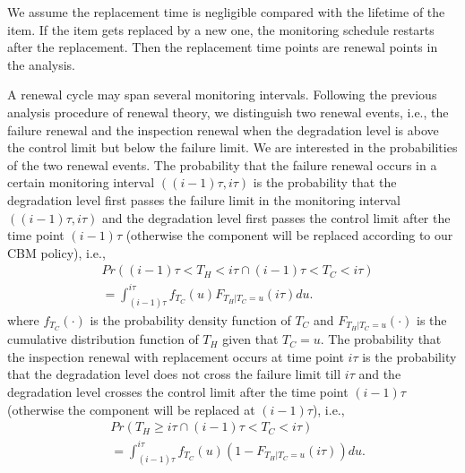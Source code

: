 \documentclass[10pt,a4paper]{article}
\theoremstyle{remark}
\begin{document}
We assume the replacement time is negligible compared with the lifetime of the item. If the item gets replaced by a new one, the monitoring schedule restarts after the replacement. Then the replacement time points are renewal points in the analysis. 

A renewal cycle may span several monitoring intervals. Following the previous analysis procedure of renewal theory, we distinguish two renewal events, i.e., the failure renewal and the inspection renewal when the degradation level is above the control limit but below the failure limit. We are interested in the probabilities of the two renewal events. The probability that the failure renewal occurs in a certain monitoring interval $((i-1)\tau,i\tau)$ is the probability that the degradation level first passes the failure limit in the monitoring interval $((i-1)\tau,i\tau)$ and the degradation level first passes the control limit after the time point $(i-1)\tau$ (otherwise the component will be replaced according to our CBM policy), i.e.,
\begin{align*}
& Pr((i-1)\tau<T_{H}<i\tau \cap (i-1)\tau<T_{C}<i\tau ) \nonumber \\
& = \int_{(i-1)\tau}^{i\tau} f_{T_{C}}(u) F_{T_{H}|T_{C}=u}(i\tau)du. 
\end{align*} 
where $f_{T_{C}}(\cdot)$ is the probability density function of $T_{C}$ and $F_{T_{H}|T_{C}=u}(\cdot)$ is the cumulative distribution function of $T_{H}$ given that $T_{C}=u$. 
The probability that the inspection renewal with replacement occurs at time point $i\tau$ is the probability that the degradation level does not cross the failure limit till $i\tau$ and the degradation level crosses the control limit after the time point $(i-1)\tau$ (otherwise the component will be replaced at $(i-1)\tau$), i.e.,
\begin{align*}
& Pr(T_{H}\geq i\tau \cap (i-1)\tau<T_{C}<i\tau ) \nonumber \\
& = \int_{(i-1)\tau}^{i\tau} f_{T_{C}}(u) (1-F_{T_{H}|T_{C}=u}(i\tau))du. 
\end{align*} 
\end{document}
